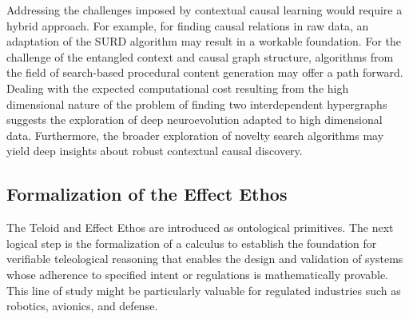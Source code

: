 Addressing the challenges imposed by contextual causal learning would require a hybrid approach. For example, for finding causal relations in raw data, an adaptation of the SURD algorithm\cite{martinez2024decomposing} may result in a workable foundation. For the challenge of the entangled context and causal graph structure, algorithms from the field of search-based procedural content generation\cite{togelius2011search} may offer a path forward. Dealing with the expected computational cost resulting from the high dimensional nature of the problem of finding two interdependent hypergraphs suggests the exploration of deep neuro\-evolution adapted to high dimensional data\cite{colas2020scaling}. Furthermore, the broader exploration of novelty search\cite{lehman2011abandoning} algorithms may yield deep insights about robust contextual causal discovery. 

\subsection{Formalization of the Effect Ethos}

The Teloid and Effect Ethos are introduced as ontological primitives. The next logical step is the formalization of a calculus to establish the foundation for verifiable teleological reasoning that enables the design and validation of systems whose adherence to specified intent or regulations is mathematically provable. This line of study might be particularly valuable for regulated industries such as robotics, avionics, and defense. 

% 

\newpage

